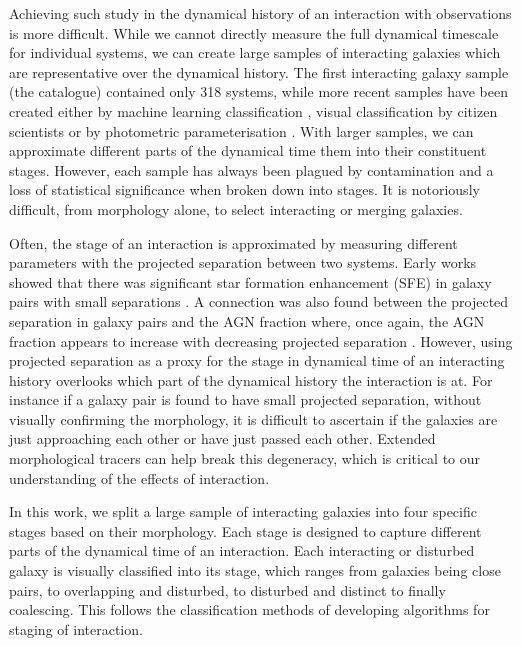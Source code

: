 Achieving such study in the dynamical history of an interaction with observations is more difficult. While we cannot directly measure the full dynamical timescale for individual systems, we can create large samples of interacting galaxies which are representative over the dynamical history. The first interacting galaxy sample (the \citet{1966ApJS...14....1A} catalogue) contained only 318 systems, while more recent samples have been created either by machine learning classification \citep{2019A&A...626A..49P, 2023A&A...669A.141S}, visual classification by citizen scientists \citep{2010MNRAS.401.1043D} or by photometric parameterisation \citep{2004AJ....128..163L, 2023MNRAS.522....1N}. With larger samples, we can approximate different parts of the dynamical time them into their constituent stages. However, each sample has always been plagued by contamination and a loss of statistical significance when broken down into stages. It is notoriously difficult, from morphology alone, to select interacting or merging galaxies.

Often, the stage of an interaction is approximated by measuring different parameters with the projected separation between two systems. Early works showed that there was significant star formation enhancement (SFE) in galaxy pairs with small separations \citep{2003MNRAS.346.1189L,2008AJ....135.1877E, 2022ApJ...940....4S}. A connection was also found between the projected separation in galaxy pairs and the AGN fraction where, once again, the AGN fraction appears to increase with decreasing projected separation \citep{2009MNRAS.399.2172R, 2011MNRAS.418.2043E, 2017MNRAS.465.2671G, 2021ApJ...909..124S}. However, using projected separation as a proxy for the stage in dynamical time of an interacting history overlooks which part of the dynamical history the interaction is at. For instance if a galaxy pair is found to have small projected separation, without visually confirming the morphology, it is difficult to ascertain if the galaxies are just approaching each other or have just passed each other. Extended morphological tracers can help break this degeneracy, which is critical to our understanding of the effects of interaction.

In this work, we split a large sample of interacting galaxies into four specific stages based on their morphology. Each stage is designed to capture different parts of the dynamical time of an interaction. Each interacting or disturbed galaxy is visually classified into its stage, which ranges from galaxies being close pairs, to overlapping and disturbed, to disturbed and distinct to finally coalescing. This follows the classification methods of developing algorithms for staging of interaction\citep{2019MNRAS.490.5390B,2022ApJ...937...97C}. 

